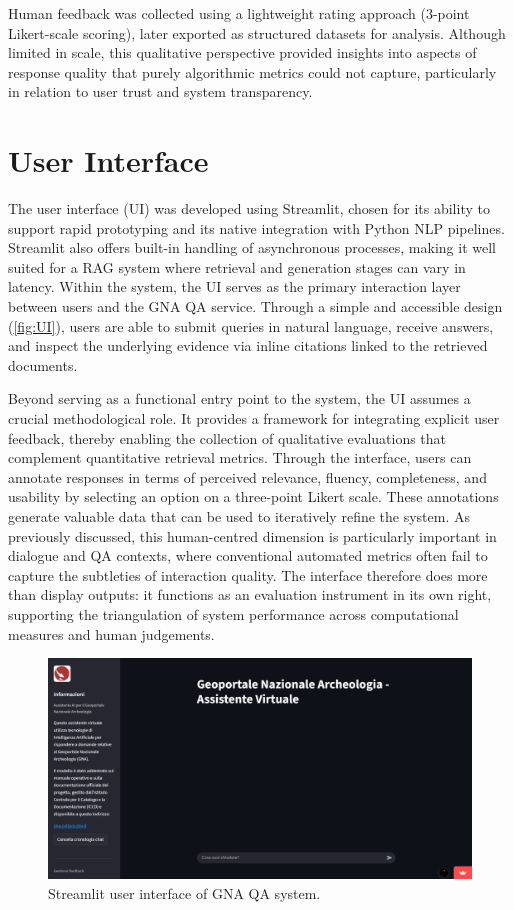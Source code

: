 \begin{spacing}{1.5}
Human feedback was collected using a lightweight rating approach (3-point Likert-scale scoring), later exported as structured datasets for analysis. Although limited in scale, this qualitative perspective provided insights into aspects of response quality that purely algorithmic metrics could not capture, particularly in relation to user trust and system transparency.



\section{User Interface}
The user interface (UI) was developed using Streamlit, chosen for its ability to support rapid prototyping and its native integration with Python NLP pipelines. Streamlit also offers built-in handling of asynchronous processes, making it well suited for a RAG system where retrieval and generation stages can vary in latency. Within the system, the UI serves as the primary interaction layer between users and the GNA QA service. Through a simple and accessible design (\autoref{fig:UI}), users are able to submit queries in natural language, receive answers, and inspect the underlying evidence via inline citations linked to the retrieved documents.

Beyond serving as a functional entry point to the system, the UI assumes a crucial methodological role. It provides a framework for integrating explicit user feedback, thereby enabling the collection of qualitative evaluations that complement quantitative retrieval metrics. Through the interface, users can annotate responses in terms of perceived relevance, fluency, completeness, and usability by selecting an option on a three-point Likert scale. These annotations generate valuable data that can be used to iteratively refine the system. As previously discussed, this human-centred dimension is particularly important in dialogue and QA contexts, where conventional automated metrics often fail to capture the subtleties of interaction quality. The interface therefore does more than display outputs: it functions as an evaluation instrument in its own right, supporting the triangulation of system performance across computational measures and human judgements.

\vspace{0.8em}
\begin{figure}[H]
  \centering
  \includegraphics[width=\textwidth]{images/UI_full.png} 
  \caption{Streamlit user interface of GNA QA system.}
  \label{fig:UI}
\end{figure}


\end{spacing}
